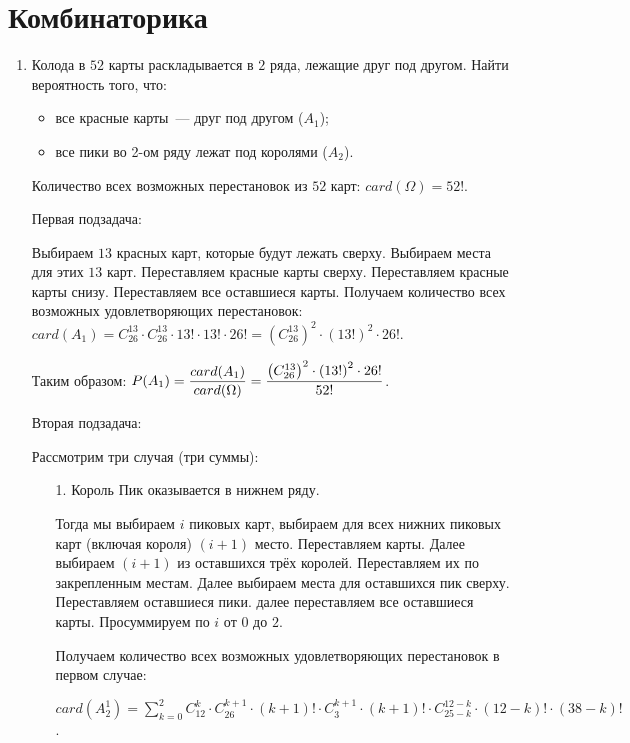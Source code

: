 \documentclass{article}
\begin{document}
\section*{Комбинаторика}
\begin{enumerate}
	\item Колода в $52$ карты раскладывается в $2$ ряда, лежащие друг под другом. Найти вероятность того, что:
        \begin{itemize}
            \item все красные карты~--- друг под другом ($A_1$); 
            \item все пики во 2-ом ряду лежат под королями ($A_2$).
        \end{itemize}
        
        \solution{}
        
        Количество всех возможных перестановок из $52$ карт: $card(\Omega) = 52!$.

        Первая подзадача:
        
        Выбираем $13$ красных карт, которые будут лежать сверху. Выбираем места для этих $13$ карт. Переставляем красные карты сверху. Переставляем красные карты снизу. Переставляем все оставшиеся карты. Получаем количество всех возможных удовлетворяющих перестановок: $card(A_1) = C_{26}^{13} \cdot C_{26}^{13} \cdot 13! \cdot 13! \cdot 26! = \left( C_{26}^{13} \right) ^ 2 \cdot \left( 13! \right) ^ 2 \cdot 26!$.
        
        Таким образом: $\displaystyle{P(A_1) = \frac{card(A_1)}{card(\Omega)} = \frac{\left( C_{26}^{13} \right) ^ 2 \cdot \left( 13! \right) ^ 2 \cdot 26!}{52!}}$.

        Вторая подзадача:

        Рассмотрим три случая (три суммы):
        \begin{itemize}
            \item[1.] Король Пик оказывается в нижнем ряду.

            Тогда мы выбираем $i$ пиковых карт, выбираем для всех нижних пиковых карт (включая короля) $(i + 1)$ место. Переставляем карты. Далее выбираем $(i + 1)$ из оставшихся трёх королей. Переставляем их по закрепленным местам. Далее выбираем места для оставшихся пик сверху. Переставляем оставшиеся пики. далее переставляем все оставшиеся карты. Просуммируем по $i$ от $0$ до $2$.

            Получаем количество всех возможных удовлетворяющих перестановок в первом случае:
            
            $card(A_2^1) = \sum\limits_{k = 0}^{2} C_{12}^k \cdot C_{26}^{k + 1} \cdot (k+1)! \cdot C_3^{k + 1} \cdot (k+1)! \cdot C_{25 - k}^{12 - k} \cdot (12 - k)! \cdot (38 - k)!$.


\end{itemize}
\end{enumerate}
\end{document}
